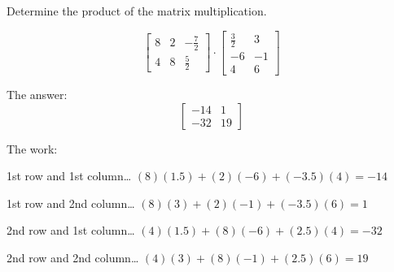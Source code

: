 
\begin{question}
Determine the product of the matrix multiplication.

\[\left[\begin{matrix}8 & 2 & - \frac{7}{2}\\4 & 8 & \frac{5}{2}\end{matrix}\right] \cdot \left[\begin{matrix}\frac{3}{2} & 3\\-6 & -1\\4 & 6\end{matrix}\right]\]
\end{question}

\begin{solution}
The answer: \[\left[\begin{matrix}-14 & 1\\-32 & 19\end{matrix}\right]\]

The work:

1st row and 1st column\ldots{} \((8)(1.5)+(2)(-6)+(-3.5)(4) = -14\)

1st row and 2nd column\ldots{} \((8)(3)+(2)(-1)+(-3.5)(6) = 1\)

2nd row and 1st column\ldots{} \((4)(1.5)+(8)(-6)+(2.5)(4) = -32\)

2nd row and 2nd column\ldots{} \((4)(3)+(8)(-1)+(2.5)(6) = 19\)
\end{solution}

